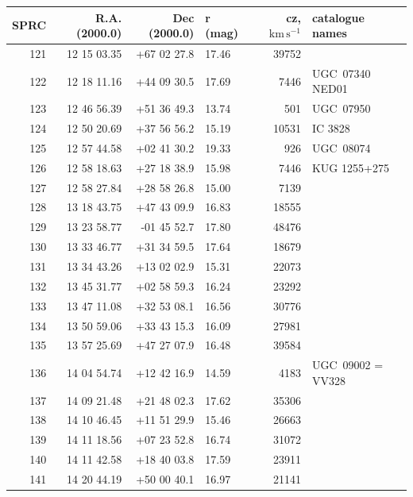 \documentclass[useAMS,usenatbib]{mn2e}
\newcommand{\km}{\,\mbox{km}\,\mbox{s}^{-1}}
\begin{document}
  \begin{table}
 \contcaption{ }
 \begin{tabular}{rrrlrl}
 \hline
SPRC  &  R.A. (2000.0)   &  Dec (2000.0)  &  r (mag)     & cz, $\km$& catalogue names  \\
 \hline
 121 &  12 15 03.35 & +67 02 27.8 &  17.46 &  39752 &                  \\
 122 &  12 18 11.16 & +44 09 30.5 &  17.69 &   7446 & UGC~07340 NED01  \\
 123 &  12 46 56.39 & +51 36 49.3 &  13.74 &    501 &       UGC~07950  \\
 124 &  12 50 20.69 & +37 56 56.2 &  15.19 &  10531 &         IC 3828  \\
 125 &  12 57 44.58 & +02 41 30.2 &  19.33 &    926 &       UGC~08074  \\
 126 &  12 58 18.63 & +27 18 38.9 &  15.98 &   7446 &    KUG 1255+275  \\
 127 &  12 58 27.84 & +28 58 26.8 &  15.00 &   7139 &                  \\
 128 &  13 18 43.75 & +47 43 09.9 &  16.83 &  18555 &                  \\
 129 &  13 23 58.77 & -01 45 52.7 &  17.80 &  48476 &                  \\
 130 &  13 33 46.77 & +31 34 59.5 &  17.64 &  18679 &                  \\
 131 &  13 34 43.26 & +13 02 02.9 &  15.31 &  22073 &                  \\
 132 &  13 45 31.77 & +02 58 59.3 &  16.24 &  23292 &                  \\
 133 &  13 47 11.08 & +32 53 08.1 &  16.56 &  30776 &                  \\
 134 &  13 50 59.06 & +33 43 15.3 &  16.09 &  27981 &                  \\
 135 &  13 57 25.69 & +47 27 07.9 &  16.48 &  39584 &                  \\
 136 &  14 04 54.74 & +12 42 16.9 &  14.59 &   4183 &UGC~09002 = VV328 \\
 137 &  14 09 21.48 & +21 48 02.3 &  17.62 &  35306 &                  \\
 138 &  14 10 46.45 & +11 51 29.9 &  15.46 &  26663 &                  \\
 139 &  14 11 18.56 & +07 23 52.8 &  16.74 &  31072 &                  \\
 140 &  14 11 42.58 & +18 40 03.8 &  17.59 &  23911 &                  \\
 141 &  14 20 44.19 & +50 00 40.1 &  16.97 &  21141 &                  \\

\end{tabular}
\end{table}
\end{document}
